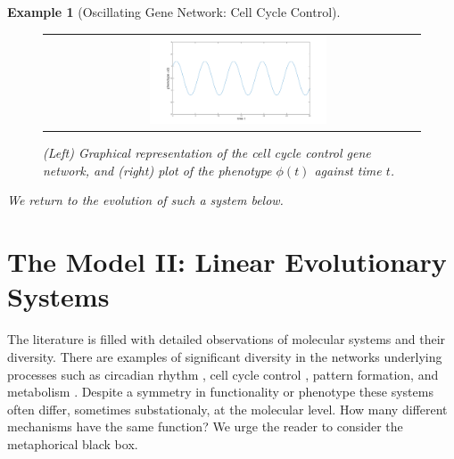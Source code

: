 \documentclass[9 pt]{article}
\newcommand{\plr}[1]{{\color{blue}\it #1}}
\newcommand{\1}{\mathbbm{1}}
\newtheorem{example}{Example}
\begin{document}
\begin{example}[Oscillating Gene Network: Cell Cycle Control]
\begin{figure}[H]
\begin{tabular}{cc}
\begin{tikzpicture}
            \end{tikzpicture} &
      \includegraphics[width=0.5\textwidth, height=0.25\paperheight]{osc_impulse}
   \end{tabular}
      \caption{(Left) Graphical representation of the cell cycle control gene network, and (right) plot of the phenotype $\phi(t)$ against time $t$.}
    \end{figure}
      We return to the evolution of such a system below.
  \end{example}

  \section*{The Model II: Linear Evolutionary Systems}

  The literature is filled with detailed observations of molecular systems and their diversity. There are examples of significant diversity in the networks underlying processes such as circadian rhythm \citep{sancar2008intelligent}, cell cycle control \citep{cross2011evolution, kearsey2003enigmatic}, pattern formation, and metabolism  \citep{lavoie2009rearrangements, martchenko2007transcriptional, dalal2016transcriptional, christensen2011unique, hartl2007induction, alam2013aspergillus}. Despite a symmetry in functionality or phenotype these systems often differ, sometimes substationaly, at the molecular level. How many different mechanisms have the same function? We urge the reader to consider the metaphorical black box.
\end{document}

